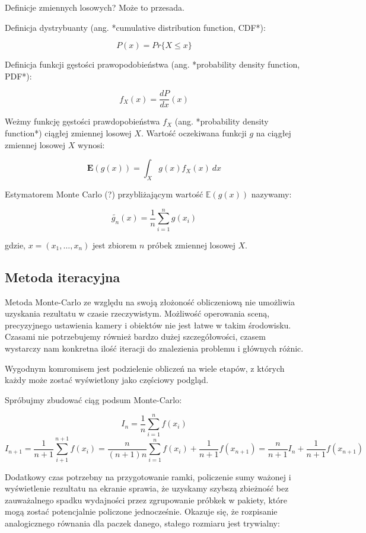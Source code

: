 \documentclass[../main.tex]{subfiles}
\begin{document}
Definicje zmiennych losowych? Może to przesada.

Definicja dystrybuanty (ang. *cumulative distribution function, CDF*):

$$
P(x) = Pr \{ X \leq x \}
$$

Definicja funkcji gęstości prawopodobieństwa (ang. *probability density
function, PDF*):

$$
f_{X}(x) = \frac{dP}{dx}(x)
$$

Weżmy funkcję gęstości prawdopobieństwa $f_X$ (ang. *probability density
function*) ciągłej zmiennej losowej $X$. Wartość oczekiwana funkcji $g$ na
ciągłej zmiennej losowej $X$ wynosi:

$$
\mathbf{E}(g(x)) =
\int_{X}{
    g(x) f_{X}(x)
    \:dx
}
$$

Estymatorem Monte Carlo (?) przybliżającym wartość $\mathbb{E}(g(x))$ nazywamy:

$$
\widetilde{g_n}(x) =
    \frac{1}{n}
    \sum_{i=1}^{n}g(x_i)
$$

gdzie, $x=(x_1, \ldots, x_n)$ jest zbiorem $n$ próbek zmiennej losowej $X$.

\subsection{Metoda iteracyjna}

Metoda Monte-Carlo ze względu na swoją złożoność obliczeniową nie umożliwia
uzyskania rezultatu w czasie rzeczywistym. Możliwość operowania sceną,
precyzyjnego ustawienia kamery i obiektów nie jest łatwe w takim środowisku.
Czasami nie potrzebujemy również bardzo dużej szczegółowości, czasem wystarczy
nam konkretna ilość iteracji do znalezienia problemu i głównych różnic.

Wygodnym komromisem jest podzielenie obliczeń na wiele etapów, z których każdy
może zostać wyświetlony jako częściowy podgląd.

Spróbujmy zbudować ciąg podsum Monte-Carlo:

$$
I_n = \frac{1}{n} \sum_{i=1}^{n} f(x_i)
$$
$$
I_{n+1} = \frac{1}{n+1} \sum_{i+1}^{n+1}f(x_i)
= \frac{n}{(n+1)n} \sum_{i=1}^{n}f(x_i) + \frac{1}{n+1}f(x_{n+1})
= \frac{n}{n+1} I_{n} + \frac{1}{n+1}f(x_{n+1})
$$

Dodatkowy czas potrzebny na przygotowanie ramki, policzenie sumy ważonej
i wyświetlenie rezultatu na ekranie sprawia, że uzyskamy szybszą zbieżność bez
zauważalnego spadku wydajności przez zgrupowanie próbkek w pakiety, które mogą
zostać potencjalnie policzone jednocześnie. Okazuje się, że rozpisanie
analogicznego równania dla paczek danego, stałego rozmiaru jest trywialny:
\end{document}
